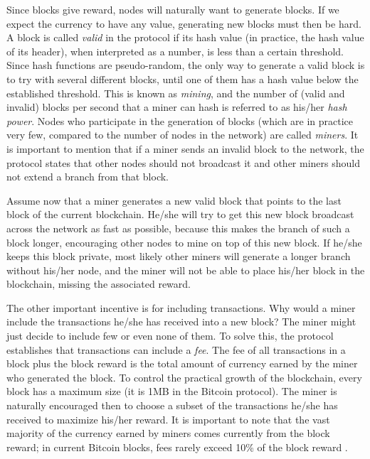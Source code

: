 Since blocks give reward, nodes will naturally want to generate blocks. If we expect the currency to have any value, generating new blocks must then be hard. A block is called \emph{valid} in the protocol if its hash value (in practice, the hash value of its header), when interpreted as a number, is less than a certain threshold. Since hash functions are pseudo-random, the only way to generate a valid block is to try with several different blocks, until one of them has a hash value below the established threshold. This is known as \emph{mining}, and the number of (valid and invalid) blocks per second that a miner can hash is referred to as his/her \emph{hash power}. Nodes who participate in the generation of blocks (which are in practice very few, compared to the number of nodes in the network) are called \emph{miners}. It is important to mention that if a miner sends an invalid block to the network, the protocol states that other nodes should not broadcast it and other miners should not extend a branch from that block. 

Assume now that a miner generates a new valid block that points to the last block of the current blockchain. He/she will try to get this new block broadcast across the network as fast as possible, because this makes the branch of such a block longer, encouraging other nodes to mine on top of this new block. If he/she keeps this block private, most likely other miners will generate a longer branch without his/her node, and the miner will not be able to place his/her block in the blockchain, missing the associated reward.

The other important incentive is for including transactions. Why would a miner include the transactions he/she has received into a new block? The miner might just decide to include few or even none of them. To solve this, the protocol establishes that transactions can include a \emph{fee}. The fee of all transactions in a block plus the block reward is the total amount of currency earned by the miner who generated the block. To control the practical growth of the blockchain, every block has a maximum size (it is 1MB in the Bitcoin protocol). The miner is naturally encouraged then to choose a subset of the transactions he/she has received to maximize his/her reward. It is important to note that the vast majority of the currency earned by miners comes currently from the block reward; in current Bitcoin blocks, fees rarely exceed 10\% of the block reward \cite{TotalMiningRevenue,TotalMiningFees}. 


